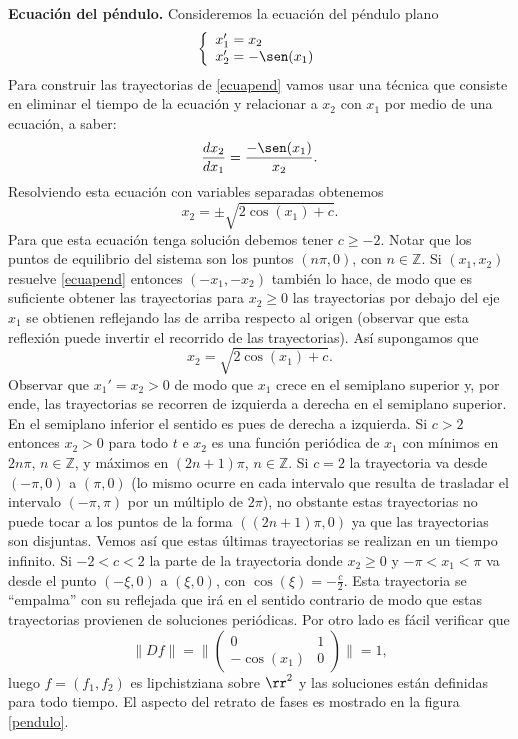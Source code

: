 \begin{ejemplo}{}\textbf{Ecuación del péndulo.} Consideremos la ecuación del péndulo plano
\begin{equation}\label{ecuapend}
\left\{%
\begin{array}{l}
    x_1'=x_2 \\
    x_2'=-\sen(x_1) \\
\end{array}%
\right.
\end{equation}
Para construir las trayectorias de \eqref{ecuapend} vamos usar una
técnica que consiste en eliminar el tiempo de la ecuación y
relacionar a $x_2$ con $x_1$ por medio de una ecuación, a saber:
\[
    \frac{dx_2}{dx_1}=\frac{-\sen(x_1)}{x_2 }.
\]
Resolviendo esta ecuación con variables separadas obtenemos
\[
    x_2=\pm\sqrt{2\cos(x_1)+c}.
\]
Para que esta ecuación tenga solución debemos tener $c\geq -2$.
Notar que los puntos de equilibrio del sistema son los puntos
$(n\pi,0)$, con $n\in\mathbb{Z}$. Si $(x_1,x_2)$ resuelve
\eqref{ecuapend} entonces $(-x_1,-x_2)$ también lo hace, de modo
que es suficiente obtener las trayectorias para $x_2\geq 0$ las
trayectorias por debajo del eje $x_1$ se obtienen reflejando las
de arriba respecto al origen (observar que esta reflexión puede
invertir el recorrido de las trayectorias). Así supongamos que
\[
    x_2=\sqrt{2\cos(x_1)+c}.
\]
Observar que $x_1'=x_2>0$ de modo que $x_1$ crece en el semiplano
superior y, por ende, las trayectorias se recorren de izquierda a
derecha en el semiplano superior. En el semiplano inferior el
sentido es pues de derecha a izquierda. Si $c>2$ entonces $x_2>0$
para todo $t$ e $x_2$ es una función periódica de $x_1$ con
mínimos en $2n\pi$, $n\in\mathbb{Z}$, y máximos en $(2n+1)\pi$,
$n\in\mathbb{Z}$. Si $c=2$ la trayectoria va desde $(-\pi,0)$ a
$(\pi,0)$ (lo mismo ocurre en cada intervalo que resulta de
trasladar el intervalo $(-\pi,\pi)$ por un múltiplo de $2\pi$), no
obstante estas trayectorias no puede tocar a los puntos de la
forma $((2n+1)\pi,0)$ ya que las trayectorias son disjuntas. Vemos
así que estas últimas trayectorias se realizan en un tiempo
infinito. Si $-2<c<2$ la parte de la trayectoria donde $x_2\geq 0$
y $-\pi <x_1<\pi$ va desde el punto $(-\xi,0)$ a $(\xi,0)$, con
$\cos(\xi)=-\frac{c}{2}$. Esta trayectoria se ``empalma'' con su
reflejada que irá en el sentido contrario de modo que estas
trayectorias provienen de soluciones periódicas. Por otro lado es
fácil verificar que
\[
    \|Df\|=\bigg\|\begin{pmatrix}
    0&1\\-\cos(x_1)&0\end{pmatrix}\bigg\|= 1,
\]
luego $f=(f_1,f_2)$ es lipchistziana sobre $\rr^2$ y las
soluciones están definidas para todo tiempo. El aspecto del
retrato de fases es mostrado en la figura \ref{pendulo}.
\begin{figure}[h]
\begin{center}
\def\Func{y[1]|-sin(y[0])}


\end{center}
\end{figure}
\end{ejemplo}
